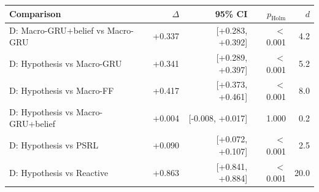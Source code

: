 \begin{tabular}{lrrrr}
\toprule
Comparison & $\Delta$ & 95\% CI & $p_{\text{Holm}}$ & $d$ \\
\midrule
D: Macro-GRU+belief vs Macro-GRU & +0.337 & [+0.283, +0.392] & $<$0.001 & 4.2 \\
D: Hypothesis vs Macro-GRU & +0.341 & [+0.289, +0.397] & $<$0.001 & 5.2 \\
D: Hypothesis vs Macro-FF & +0.417 & [+0.373, +0.461] & $<$0.001 & 8.0 \\
D: Hypothesis vs Macro-GRU+belief & +0.004 & [-0.008, +0.017] & 1.000 & 0.2 \\
D: Hypothesis vs PSRL & +0.090 & [+0.072, +0.107] & $<$0.001 & 2.5 \\
D: Hypothesis vs Reactive & +0.863 & [+0.841, +0.884] & $<$0.001 & 20.0 \\
\bottomrule
\end{tabular}
